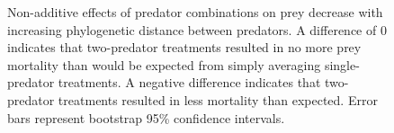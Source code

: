 \documentclass[11pt]{article}
\begin{document}
\begin{figure}[htbp]
\caption[Non-additive effects of predator combinations on prey
decrease with increasing phylogenetic distance between predators]{Non-additive effects of predator combinations on prey
decrease with increasing phylogenetic distance between predators. A
difference of 0 indicates that two-predator treatments resulted in no
more prey mortality than would be expected from simply averaging
single-predator treatments. A negative difference indicates that
two-predator treatments resulted in less mortality than expected. Error
bars represent bootstrap 95\% confidence intervals.}
\label{fig:non_additive}
\end{figure}






\end{document}
